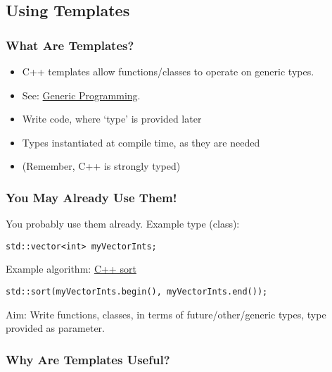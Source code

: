 \hypertarget{using-templates}{%
\subsection{Using Templates}\label{using-templates}}

\hypertarget{what-are-templates}{%
\subsubsection{What Are Templates?}\label{what-are-templates}}

\begin{itemize}
\tightlist
\item
  C++ templates allow functions/classes to operate on generic types.
\item
  See: \href{http://en.wikipedia.org/wiki/Generic_programming}{Generic
  Programming}.
\item
  Write code, where `type' is provided later
\item
  Types instantiated at compile time, as they are needed
\item
  (Remember, C++ is strongly typed)
\end{itemize}

\hypertarget{you-may-already-use-them}{%
\subsubsection{You May Already Use
Them!}\label{you-may-already-use-them}}

You probably use them already. Example type (class):

\begin{verbatim}
std::vector<int> myVectorInts;
\end{verbatim}

Example algorithm:
\href{http://www.cplusplus.com/reference/algorithm/sort/}{C++ sort}

\begin{verbatim}
std::sort(myVectorInts.begin(), myVectorInts.end());
\end{verbatim}

Aim: Write functions, classes, in terms of future/other/generic types,
type provided as parameter.

\hypertarget{why-are-templates-useful}{%
\subsubsection{Why Are Templates
Useful?}\label{why-are-templates-useful}}

